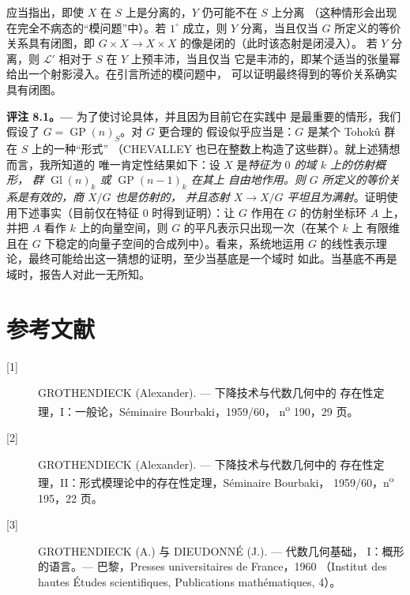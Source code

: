 应当指出，即使 $X$ 在 $S$ 上是分离的，$Y$ 仍可能不在 $S$ 上分离
（这种情形会出现在完全不病态的“模问题”中）。若 $1^\circ$ 成立，则
$Y$ 分离，当且仅当 $G$ 所定义的等价关系具有闭图，即
$G\times X\to X\times X$ 的像是闭的（此时该态射是闭浸入）。
若 $Y$ 分离，则 $\mathcal L'$ 相对于 $S$ 在 $Y$ 上预丰沛，当且仅当
它是丰沛的，即某个适当的张量幂给出一个射影浸入。在引言所述的模问题中，
可以证明最终得到的等价关系确实具有闭图。

\medskip
\noindent\textbf{评注 8.1。---} 为了使讨论具体，并且因为目前它在实践中
是最重要的情形，我们假设了 $G=\operatorname{GP}(n)_S$。对 $G$ 更合理的
假设似乎应当是：$G$ 是某个 Tohokû 群在 $S$ 上的一种“形式”
（CHEVALLEY 也已在整数上构造了这些群）。就上述猜想而言，我所知道的
唯一肯定性结果如下：设 $X$ 是\emph{特征为 $0$ 的域 $k$ 上的仿射概形，
群 $\operatorname{Gl}(n)_k$ 或 $\operatorname{GP}(n-1)_k$ 在其上
自由地作用。则 $G$ 所定义的等价关系是有效的，商 $X/G$ 也是仿射的，
并且态射 $X\to X/G$ 平坦且为满射}。证明使用下述事实（目前仅在特征
$0$ 时得到证明）：让 $G$ 作用在 $G$ 的仿射坐标环 $A$ 上，并把 $A$
看作 $k$ 上的向量空间，则 $G$ 的平凡表示只出现一次（在某个 $k$ 上
有限维且在 $G$ 下稳定的向量子空间的合成列中）。看来，系统地运用
$G$ 的线性表示理论，最终可能给出这一猜想的证明，至少当基底是一个域时
如此。当基底不再是域时，报告人对此一无所知。

\section*{参考文献}

\begin{description}
\item[{[1]}] GROTHENDIECK (Alexander). --- 下降技术与代数几何中的
存在性定理，I：一般论，Séminaire Bourbaki，1959/60，
n\textsuperscript{o} 190，29 页。

\item[{[2]}] GROTHENDIECK (Alexander). --- 下降技术与代数几何中的
存在性定理，II：形式模理论中的存在性定理，Séminaire Bourbaki，
1959/60，n\textsuperscript{o} 195，22 页。

\item[{[3]}] GROTHENDIECK (A.) 与 DIEUDONNÉ (J.). --- 代数几何基础，
I：概形的语言。--- 巴黎，Presses universitaires de France，1960
（Institut des hautes Études scientifiques, Publications
mathématiques, 4）。
\end{description}

